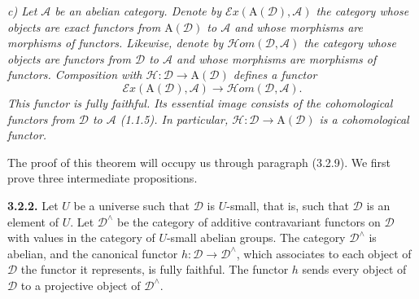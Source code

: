 \textit{c) Let $\mathcal A$ be an abelian category. Denote by
$\mathcal E x(\mathrm A(\mathcal D),\mathcal A)$ the category whose objects
are exact functors from $\mathrm A(\mathcal D)$ to $\mathcal A$ and whose
morphisms are morphisms of functors. Likewise, denote by
$\mathcal H\!om(\mathcal D,\mathcal A)$ the category whose objects are
functors from $\mathcal D$ to $\mathcal A$ and whose morphisms are morphisms
of functors. Composition with
$\mathcal H\colon\mathcal D\to\mathrm A(\mathcal D)$ defines a functor}
\[
\mathcal E x(\mathrm A(\mathcal D),\mathcal A)
\longrightarrow
\mathcal H\!om(\mathcal D,\mathcal A).
\]
\textit{This functor is fully faithful. Its essential image consists of the
cohomological functors from $\mathcal D$ to $\mathcal A$ (1.1.5). In
particular, $\mathcal H\colon\mathcal D\to\mathrm A(\mathcal D)$ is a
cohomological functor.}

The proof of this theorem will occupy us through paragraph (3.2.9). We first prove
three intermediate propositions.

\medskip
\noindent\textbf{3.2.2.}\quad
Let $U$ be a universe such that $\mathcal D$ is $U$-small, that is, such that
$\mathcal D$ is an element of $U$. Let
$\mathcal D^\wedge$ be the category of additive contravariant functors on
$\mathcal D$ with values in the category of $U$-small abelian groups. The category
$\mathcal D^\wedge$ is abelian, and the canonical functor
$h\colon\mathcal D\to\mathcal D^\wedge$, which associates to each object of
$\mathcal D$ the
functor it represents, is fully faithful. The functor $h$ sends every object
of $\mathcal D$ to a projective object of $\mathcal D^\wedge$.
\endgroup
